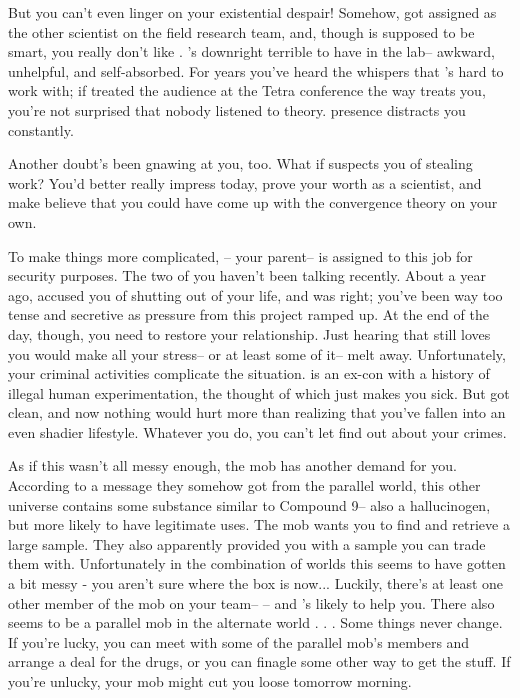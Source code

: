 \documentclass[char]{guildcamp3}
\begin{document}
But you can't even linger on your existential despair! Somehow, \cSciTwo{} got assigned as the other scientist on the field research team, and, though \cSciTwo{\they} is supposed to be smart, you really don't like \cSciTwo{\them}. \cSciTwo{\they}'s downright terrible to have in the lab-- awkward, unhelpful, and self-absorbed. For years you've heard the whispers that \cSciTwo{\they}'s hard to work with; if \cSciTwo{\they} treated the audience at the Tetra conference the way \cSciTwo{\they} treats you, you're not surprised that nobody listened to \cSciTwo{\their} theory. \cSciTwo{\Their} presence distracts you constantly.

Another doubt's been gnawing at you, too. What if \cSciTwo{\they} suspects you of stealing \cSciTwo{\their} work? You'd better really impress \cSciTwo{\them} today, prove your worth as a scientist, and make \cSciTwo{\them} believe that you could have come up with the convergence theory on your own.

To make things more complicated, \cSpecOpOne{\intro}-- your parent-- is assigned to this job for security purposes. The two of you haven't been talking recently. About a year ago, \cSpecOpOne{\they} accused you of shutting \cSpecOpOne{\them} out of your life, and \cSpecOpOne{\they} was right; you've been way too tense and secretive as pressure from this project ramped up. At the end of the day, though, you need to restore your relationship. Just hearing that \cSpecOpOne{\they} still loves you would make all your stress-- or at least some of it-- melt away. Unfortunately, your criminal activities complicate the situation. \cSpecOpOne{} is an ex-con with a history of illegal human experimentation, the thought of which just makes you sick. But \cSpecOpOne{\they} got clean, and now nothing would hurt \cSpecOpOne{\them} more than realizing that you've fallen into an even shadier lifestyle. Whatever you do, you can't let \cSpecOpOne{\them} find out about your crimes.

As if this wasn't all messy enough, the mob has another demand for you. According to a message they somehow got from the parallel world, this other universe contains some substance similar to Compound 9-- also a hallucinogen, but more likely to have legitimate uses. The mob wants you to find and retrieve a large sample. They also apparently provided you with a sample you can trade them with. Unfortunately in the combination of worlds this seems to have gotten a bit messy - you aren't sure where the box is now... Luckily, there's at least one other member of the mob on your team-- \cSpecOpTwo{\intro}-- and \cSpecOpTwo{\they}'s likely to help you. There also seems to be a parallel mob in the alternate world . . . Some things never change. If you're lucky, you can meet with some of the parallel mob's members and arrange a deal for the drugs, or you can finagle some other way to get the stuff. If you're unlucky, your mob might cut you loose tomorrow morning.
\end{document}
